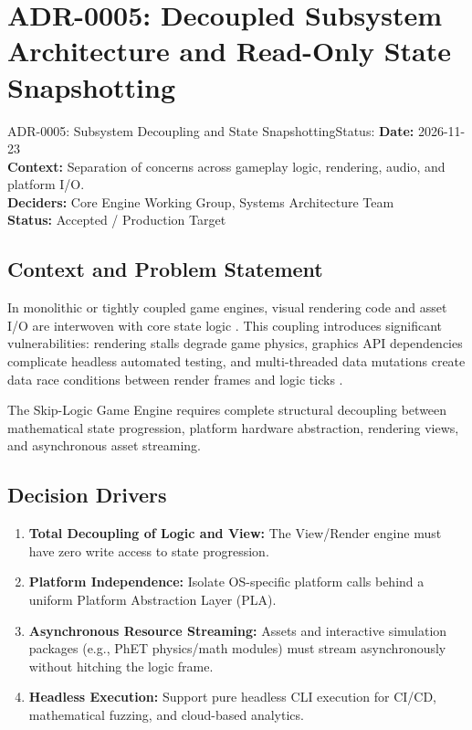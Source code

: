 \section{ADR-0005: Decoupled Subsystem Architecture and Read-Only State Snapshotting}
\label{sec:adr0005}

\begin{adrbox}{ADR-0005: Subsystem Decoupling and State Snapshotting}{Status: }
\textbf{Date:} 2026-11-23 \\
\textbf{Context:} Separation of concerns across gameplay logic, rendering, audio, and platform I/O. \\
\textbf{Deciders:} Core Engine Working Group, Systems Architecture Team \\
\textbf{Status:} Accepted / Production Target
\end{adrbox}

\subsection{Context and Problem Statement}
In monolithic or tightly coupled game engines, visual rendering code and asset I/O are interwoven with core state logic \cite{gregory2018game, sydra2023engine}. This coupling introduces significant vulnerabilities: rendering stalls degrade game physics, graphics API dependencies complicate headless automated testing, and multi-threaded data mutations create data race conditions between render frames and logic ticks \cite{gregory2018game, nystrom2014game}.

The Skip-Logic Game Engine requires complete structural decoupling between mathematical state progression, platform hardware abstraction, rendering views, and asynchronous asset streaming.

\subsection{Decision Drivers}
\begin{enumerate}[label=\bfseries D\arabic*.]
    \item \textbf{Total Decoupling of Logic and View:} The View/Render engine must have zero write access to state progression.
    \item \textbf{Platform Independence:} Isolate OS-specific platform calls behind a uniform Platform Abstraction Layer (PLA).
    \item \textbf{Asynchronous Resource Streaming:} Assets and interactive simulation packages (e.g., PhET physics/math modules) must stream asynchronously without hitching the logic frame.
    \item \textbf{Headless Execution:} Support pure headless CLI execution for CI/CD, mathematical fuzzing, and cloud-based analytics.
\end{enumerate}

